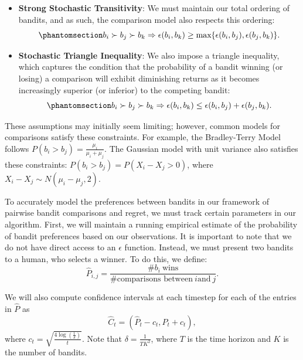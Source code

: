 \documentclass[
  letterpaper,
  numbers=noenddot,
  DIV=11]{scrreprt}
\theoremstyle{plain}
\theoremstyle{definition}
\theoremstyle{remark}
\begin{document}
\begin{itemize}
\item
  \textbf{Strong Stochastic Transitivity}: We must maintain our total
  ordering of bandits, and as such, the comparison model also respects
  this ordering:
  \begin{equation}\phantomsection\label{eq-stochastic-transitivity}{b_i \succ b_j \succ b_k \Rightarrow \epsilon(b_i, b_k) \ge \text{max}\{\epsilon(b_i, b_j), \epsilon(b_j, b_k)\}.}\end{equation}
\item
  \textbf{Stochastic Triangle Inequality}: We also impose a triangle
  inequality, which captures the condition that the probability of a
  bandit winning (or losing) a comparison will exhibit diminishing
  returns as it becomes increasingly superior (or inferior) to the
  competing bandit:
  \begin{equation}\phantomsection\label{eq-triangle-inequality}{b_i \succ b_j \succ b_k \Rightarrow \epsilon(b_i, b_k) \le \epsilon(b_i, b_j) + \epsilon(b_j, b_k).}\end{equation}
\end{itemize}

These assumptions may initially seem limiting; however, common models
for comparisons satisfy these constraints. For example, the
Bradley-Terry Model follows
\(P(b_i > b_j) = \frac{\mu_i}{\mu_i + \mu_j}\). The Gaussian model with
unit variance also satisfies these constraints:
\(P(b_i > b_j) = P(X_i - X_j > 0)\), where
\(X_i - X_j \sim N(\mu_i - \mu_j, 2)\).

To accurately model the preferences between bandits in our framework of
pairwise bandit comparisons and regret, we must track certain parameters
in our algorithm. First, we will maintain a running empirical estimate
of the probability of bandit preferences based on our observations. It
is important to note that we do not have direct access to an
\(\epsilon\) function. Instead, we must present two bandits to a human,
who selects a winner. To do this, we define:
\[\hat{P}_{i, j} = \frac{\# b_i\ \text{wins}}{\# \text{comparisons between}\ i \text{and}\ j}.\]

We will also compute confidence intervals at each timestep for each of
the entries in \(\hat{P}\) as
\[\hat{C}_t = \left( \hat{P}_t - c_t, \hat{P}_t + c_t \right),\] where
\(c_t = \sqrt{\frac{4\log(\frac{1}{\delta})}{t}}\). Note that
\(\delta = \frac{1}{TK^2}\), where \(T\) is the time horizon and \(K\)
is the number of bandits.
\end{document}
